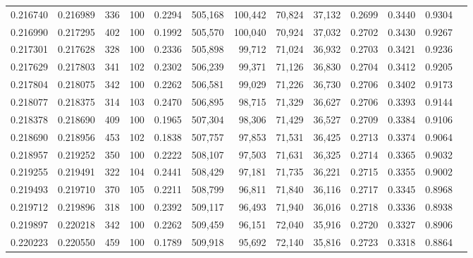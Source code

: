 \begin{tabular}{rrrrrrrrrrrrr}
0.216740 & 0.216989 &   336 & 100 &                                     0.2294 & 505,168 & 100,442 &  70,824 &  37,132 & 0.2699 & 0.3440 & 0.9304 \\
0.216990 & 0.217295 &   402 & 100 &                                     0.1992 & 505,570 & 100,040 &  70,924 &  37,032 & 0.2702 & 0.3430 & 0.9267 \\
0.217301 & 0.217628 &   328 & 100 &                                     0.2336 & 505,898 &  99,712 &  71,024 &  36,932 & 0.2703 & 0.3421 & 0.9236 \\
0.217629 & 0.217803 &   341 & 102 &                                     0.2302 & 506,239 &  99,371 &  71,126 &  36,830 & 0.2704 & 0.3412 & 0.9205 \\
0.217804 & 0.218075 &   342 & 100 &                                     0.2262 & 506,581 &  99,029 &  71,226 &  36,730 & 0.2706 & 0.3402 & 0.9173 \\
0.218077 & 0.218375 &   314 & 103 &                                     0.2470 & 506,895 &  98,715 &  71,329 &  36,627 & 0.2706 & 0.3393 & 0.9144 \\
0.218378 & 0.218690 &   409 & 100 &                                     0.1965 & 507,304 &  98,306 &  71,429 &  36,527 & 0.2709 & 0.3384 & 0.9106 \\
0.218690 & 0.218956 &   453 & 102 &                                     0.1838 & 507,757 &  97,853 &  71,531 &  36,425 & 0.2713 & 0.3374 & 0.9064 \\
0.218957 & 0.219252 &   350 & 100 &                                     0.2222 & 508,107 &  97,503 &  71,631 &  36,325 & 0.2714 & 0.3365 & 0.9032 \\
0.219255 & 0.219491 &   322 & 104 &                                     0.2441 & 508,429 &  97,181 &  71,735 &  36,221 & 0.2715 & 0.3355 & 0.9002 \\
0.219493 & 0.219710 &   370 & 105 &                                     0.2211 & 508,799 &  96,811 &  71,840 &  36,116 & 0.2717 & 0.3345 & 0.8968 \\
0.219712 & 0.219896 &   318 & 100 &                                     0.2392 & 509,117 &  96,493 &  71,940 &  36,016 & 0.2718 & 0.3336 & 0.8938 \\
0.219897 & 0.220218 &   342 & 100 &                                     0.2262 & 509,459 &  96,151 &  72,040 &  35,916 & 0.2720 & 0.3327 & 0.8906 \\
0.220223 & 0.220550 &   459 & 100 &                                     0.1789 & 509,918 &  95,692 &  72,140 &  35,816 & 0.2723 & 0.3318 & 0.8864 \\

\end{tabular}
